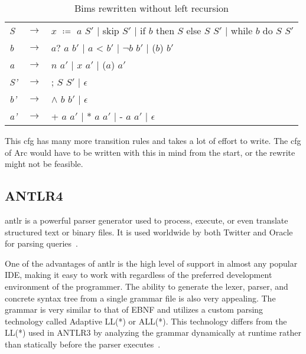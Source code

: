\begin{table}[htb!]
  \centering
  \begin{tabular}{lll}
    \textit{S}  & $\to$ & $x$ $\coloneqq$ $a$ $S'$
    $\mid$  skip $S'$
    $\mid$  if $b$ then $S$ else $S$ $S'$
    $\mid$  while $b$ do $S$ $S'$                             \\
    \textit{b}  & $\to$ & $a?$ $a$ $b'$
    $\mid$  $a$ < $b'$
    $\mid$  $\neg b$ $b'$
    $\mid$  ($b$) $b'$                                        \\
    \textit{a}  & $\to$ & $n$ $a'$
    $\mid$  $x$ $a'$
    $\mid$  ($a$) $a'$                                        \\
    \textit{S'} & $\to$ & ; $S$ $S'$
    $\mid$  $\epsilon$                                        \\
    \textit{b'} & $\to$ & $\land$ $b$ $b'$ $\mid$  $\epsilon$ \\
    \textit{a'} & $\to$ & + $a$ $a'$
    $\mid$  * $a$ $a'$
    $\mid$  - $a$ $a'$
    $\mid$  $\epsilon$                                        \\
  \end{tabular}
  \caption{Bims rewritten without left recursion}
  \label{tab:bimsrewrite}
\end{table}


This \gls{cfg} has many more transition rules and takes a lot of effort to write. The \gls{cfg} of Arc would have to be written with this in mind from the start, or the rewrite might not be feasible.

\subsection{ANTLR4}
\gls{antlr} is a powerful parser generator used to process, execute, or even translate structured text or binary files. It is used worldwide by both Twitter and Oracle for parsing queries~\cite{ANTLR_About}.

One of the advantages of \gls{antlr} is the high level of support in almost any popular IDE, making it easy to work with regardless of the preferred development environment of the programmer. The ability to generate the lexer, parser, and concrete syntax tree from a single grammar file is also very appealing. The grammar is very similar to that of EBNF and utilizes a custom parsing technology called Adaptive LL(*) or ALL(*). This technology differs from the LL(*) used in ANTLR3 by analyzing the grammar dynamically at runtime rather than statically before the parser executes~\cite{Parr2014}.

